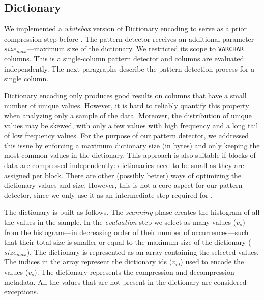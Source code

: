 \subsection{Dictionary}
\label{subsec:pd:dict}



\graphicspath{{5_automatic_learning/pattern_detection/images/}}

% 

We implemented a \textit{whitebox} version of Dictionary encoding to serve as a prior compression step before . The pattern detector receives an additional parameter \(size_{max}\)---maximum size of the dictionary. We restricted its scope to \verb|VARCHAR| columns. This is a single-column pattern detector and columns are evaluated independently. The next paragraphs describe the pattern detection process for a single column.

Dictionary encoding only produces good results on columns that have a small number of unique values. However, it is hard to reliably quantify this property when analyzing only a sample of the data. Moreover, the distribution of unique values may be skewed, with only a few values with high frequency and a long tail of low frequency values. For the purpose of our pattern detector, we addressed this issue by enforcing a maximum dictionary size (in bytes) and only keeping the most common values in the dictionary. This approach is also suitable if blocks of data are compressed independently: dictionaries need to be small as they are assigned per block. There are other (possibly better) ways of optimizing the dictionary values and size. However, this is not a core aspect for our pattern detector, since we only use it as an intermediate step required for .

The dictionary is built as follows. The \textit{scanning} phase creates the histogram of all the values in the sample. In the \textit{evaluation} step we select as many values (\(v_{s}\)) from the histogram---in decreasing order of their number of occurrences---such that their total size is smaller or equal to the maximum size of the dictionary (\(size_{max}\)). The dictionary is represented as an array containing the selected values. The indices in the array represent the dictionary ids (\(v_{id}\)) used to encode the values (\(v_{s}\)). The dictionary represents the compression and decompression metadata. All the values that are not present in the dictionary are considered exceptions.

